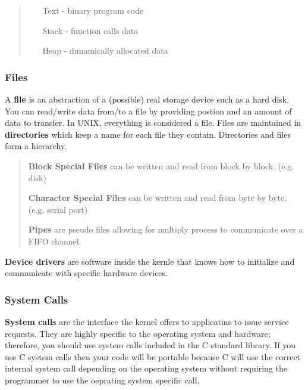 \documentclass{article}
\begin{document}
    \begin{quote}
    \begin{itemize}

    \item[Text] - binary program code

    \item[Stack] - function calls data

    \item[Heap] - dunamically allocated data

    \end{itemize}
    \end{quote}

    \subsubsection{Files}

    \noindent A \textbf{file} is an abstraction of a (possible) real storage device such as a hard disk. You can read/write data from/to a file by providing postion and an amount of data to transfer. In UNIX, everything is considered a file. Files are maintained in \textbf{directories} which keep a name for each file they contain. Directories and files form a hierarchy. 

    \begin{quote}
    
    \textbf{Block Special Files} can be written and read from block by block. (e.g. disk)

    \textbf{Character Special Files} can be written and read from byte by byte. (e.g. serial port)

    \textbf{Pipes} are pseudo files allowing for multiply process to communicate over a FIFO channel. 

    \end{quote}

    \noindent \textbf{Device drivers} are software inside the kernle that knows how to initialize and communicate with specific hardware devices. 

    \subsubsection{System Calls}

    \textbf{System calls} are the interface the kernel offers to applicatins to issue service requests. They are highly specific to the operating system and hardware; therefore, you should use system calls included in the C standard library. If you use C system calls then your code will be portable because C will use the correct internal system call depending on the operating system without requiring the programmer to use the oeprating system specific call. 
\end{document}

